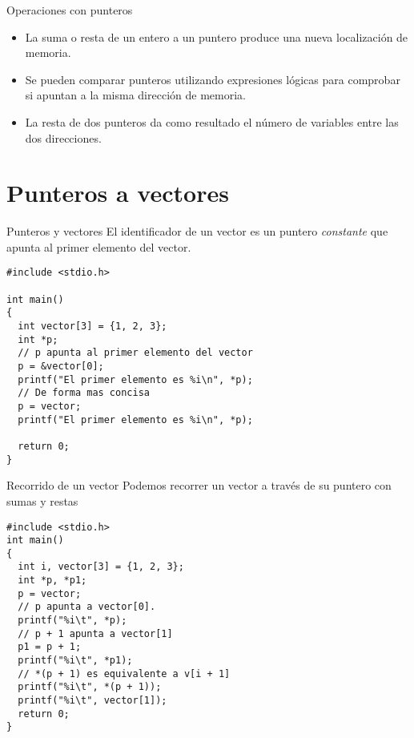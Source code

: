 \documentclass[xcolor={usenames,svgnames,dvipsnames}, aspectratio=169]{beamer}
\begin{document}
\begin{frame}[label={sec:org001412c}]{Operaciones con punteros}
\begin{itemize}
\item La \alert{suma o resta de un entero a un puntero} produce una \alert{nueva localización de memoria}.
\item Se pueden \alert{comparar punteros} utilizando expresiones lógicas para \alert{comprobar si  apuntan a la misma dirección de memoria}.
\item La \alert{resta de dos punteros} da como resultado el \alert{número de variables entre las dos direcciones}.
\end{itemize}
\end{frame}

\section{Punteros a vectores}
\label{sec:org50a7a3b}

\begin{frame}[label={sec:org212487f},fragile]{Punteros y vectores}
 El identificador de un vector es un puntero \emph{constante} que apunta al primer elemento del vector.

\lstset{language=C,label= ,caption= ,captionpos=b,numbers=none}
\begin{lstlisting}
#include <stdio.h>

int main()
{
  int vector[3] = {1, 2, 3};
  int *p;
  // p apunta al primer elemento del vector
  p = &vector[0];
  printf("El primer elemento es %i\n", *p);
  // De forma mas concisa
  p = vector;
  printf("El primer elemento es %i\n", *p);

  return 0;
}
\end{lstlisting}
\end{frame}

\begin{frame}[label={sec:org8d7c7be},fragile]{Recorrido de un vector}
 Podemos recorrer un vector a través de su puntero con sumas y restas

\lstset{language=C,label= ,caption= ,captionpos=b,numbers=none}
\begin{lstlisting}
#include <stdio.h>
int main()
{
  int i, vector[3] = {1, 2, 3};
  int *p, *p1;
  p = vector;
  // p apunta a vector[0].
  printf("%i\t", *p);
  // p + 1 apunta a vector[1]
  p1 = p + 1;
  printf("%i\t", *p1);
  // *(p + 1) es equivalente a v[i + 1]
  printf("%i\t", *(p + 1));
  printf("%i\t", vector[1]);
  return 0;
}
\end{lstlisting}
\end{frame}
\end{document}
